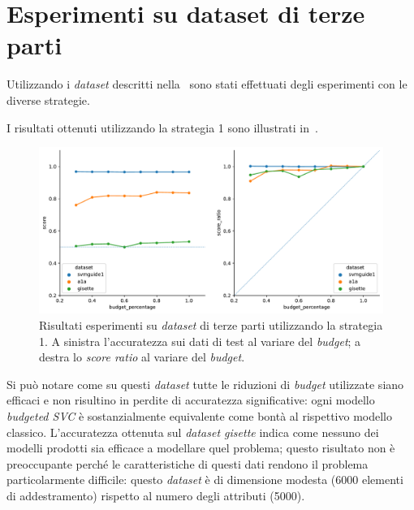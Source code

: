 \section{Esperimenti su dataset di terze parti}\label{sec:exp:real_ds}
Utilizzando i \emph{dataset} descritti nella~ sono stati effettuati degli esperimenti con le diverse strategie.

I risultati ottenuti utilizzando la strategia 1 sono illustrati in~.
\begin{figure}
    \centering
    \includegraphics[width=1\linewidth]{img//TP/tp_old_strategy.pdf}
    \caption[Risultati su \emph{dataset} di terze parti utilizzando la strategia 1.]{Risultati esperimenti su \emph{dataset} di terze parti utilizzando la strategia 1. A sinistra l'accuratezza sui dati di test al variare del \emph{budget}; a destra lo \emph{score ratio} al variare del \emph{budget}.}
    \label{fig:TP_old_strategy}
\end{figure}
Si può notare come su questi \emph{dataset} tutte le riduzioni di \emph{budget} utilizzate siano efficaci e non risultino in perdite di accuratezza significative: ogni modello \emph{budgeted SVC} è sostanzialmente equivalente come bontà al rispettivo modello classico.
L'accuratezza ottenuta sul \emph{dataset gisette} indica come nessuno dei modelli prodotti sia efficace a modellare quel problema; questo risultato non è preoccupante perché le caratteristiche di questi dati rendono il problema particolarmente difficile: questo \emph{dataset} è di dimensione modesta (6000 elementi di addestramento) rispetto al numero degli attributi (5000).


